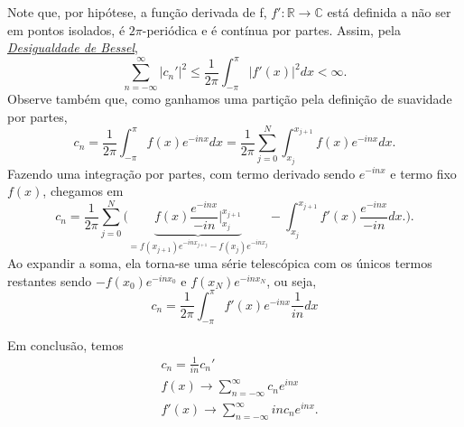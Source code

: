 \documentclass[../pde_notes.tex]{subfiles}
\begin{document}
\begin{proof*}
	Note que, por hipótese, a função derivada de f, \(f':\mathbb{R}\rightarrow \mathbb{C}\) está definida a não ser em pontos isolados, é \(2\pi \)-periódica e é contínua por partes. Assim, pela \hyperlink{bessel_inequality}{\textit{Desigualdade de Bessel}},
	\[
		\sum\limits_{n=-\infty}^{\infty}|c_{n}'|^{2}\leq \frac{1}{2\pi }\int_{-\pi }^{\pi }|f'(x)|^{2}dx < \infty.
	\]
	Observe também que, como ganhamos uma partição pela definição de suavidade por partes,
	\[
		c_{n} = \frac{1}{2\pi }\int_{-\pi }^{\pi }f(x)e^{-inx}dx = \frac{1}{2\pi }\sum\limits_{j=0}^{N}\int_{x_{j}}^{x_{j+1}}f(x)e^{-inx}dx.
	\]
	Fazendo uma integração por partes, com termo derivado sendo \(e^{-inx}\) e termo fixo \(f(x)\), chegamos em
	\[
		c_{n} = \frac{1}{2\pi }\sum\limits_{j=0}^{N}\biggl(\underbrace{f(x)\frac{e^{-inx}}{-in}\biggl|_{x_{j}}^{x_{j+1}}}_{=f(x_{j+1})e^{-inx_{j+1}}-f(x_{j})e^{-inx_{j}}} - \int_{x_{j}}^{x_{j+1}}f'(x)\frac{e^{-inx}}{-in}dx\biggr.\biggr).
	\]
	Ao expandir a soma, ela torna-se uma série telescópica com os únicos termos restantes sendo \(-f(x_{0})e^{-inx_{0}}\) e \(f(x_{N})e^{-inx_{N}}\), ou seja,
	\[
		c_{n} = \frac{1}{2\pi }\int_{-\pi}^{\pi}f'(x)e^{-inx}\frac{1}{in}dx
	\]

	Em conclusão, temos
	\begin{align*}
		 & c_{n} = \frac{1}{in}c_{n}'                                       \\
		 & f(x) \rightarrow \sum\limits_{n=-\infty}^{\infty}c_{n}e^{inx}    \\
		 & f'(x)\rightarrow \sum\limits_{n=-\infty}^{\infty}inc_{n}e^{inx}.
	\end{align*}


\end{proof*}
\end{document}
